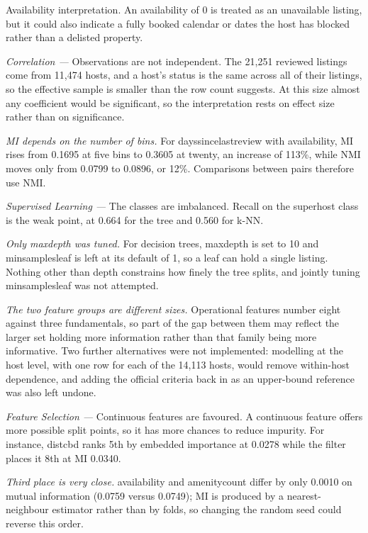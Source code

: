 \documentclass[final,1p,11pt]{elsarticle}
\renewcommand\_{\textunderscore\allowbreak}%
\begin{document}
Availability interpretation. An availability\_365 of 0 is treated as an unavailable listing, but it could also indicate a fully booked calendar or dates the host has blocked rather than a delisted property.

\textit{Correlation —} Observations are not independent. The 21,251 reviewed listings come from 11,474 hosts, and a host's status is the same across all of their listings, so the effective sample is smaller than the row count suggests. At this size almost any coefficient would be significant, so the interpretation rests on effect size rather than on significance.

\textit{MI depends on the number of bins.} For days\_since\_last\_review with availability\_365, MI rises from 0.1695 at five bins to 0.3605 at twenty, an increase of 113\%, while NMI moves only from 0.0799 to 0.0896, or 12\%. Comparisons between pairs therefore use NMI.

\textit{Supervised Learning —} The classes are imbalanced. Recall on the superhost class is the weak point, at 0.664 for the tree and 0.560 for k-NN.

\textit{Only max\_depth was tuned.} For decision trees, max\_depth is set to 10 and min\_samples\_leaf is left at its default of 1, so a leaf can hold a single listing. Nothing other than depth constrains how finely the tree splits, and jointly tuning min\_samples\_leaf was not attempted.

\textit{The two feature groups are different sizes.} Operational features number eight against three fundamentals, so part of the gap between them may reflect the larger set holding more information rather than that family being more informative. Two further alternatives were not implemented: modelling at the host level, with one row for each of the 14,113 hosts, would remove within-host dependence, and adding the official criteria back in as an upper-bound reference was also left undone.

\textit{Feature Selection —} Continuous features are favoured. A continuous feature offers more possible split points, so it has more chances to reduce impurity. For instance, dist\_cbd ranks 5th by embedded importance at 0.0278 while the filter places it 8th at MI 0.0340.

\textit{Third place is very close.} availability\_365 and amenity\_count differ by only 0.0010 on mutual information (0.0759 versus 0.0749); MI is produced by a nearest-neighbour estimator rather than by folds, so changing the random seed could reverse this order.
\end{document}
